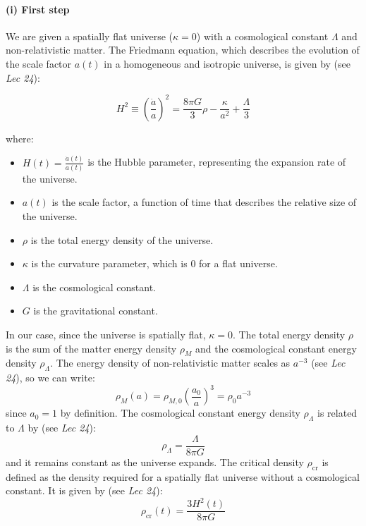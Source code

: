 \documentclass{article}
\begin{document}
\paragraph{(i) First step}
We are given a spatially flat universe ($\kappa = 0$) with a cosmological constant $\Lambda$ and non-relativistic matter. The Friedmann equation, which describes the evolution of the scale factor $a(t)$ in a homogeneous and isotropic universe, is given by (see \emph{Lec 24}):

\begin{equation}
\label{eq:friedmann}
H^{2} \equiv \left( \frac{\dot{a}}{a} \right)^{2} = \frac{8\pi G}{3}\rho - \frac{\kappa }{a^{2}} + \frac{\Lambda }{3}
\end{equation}

where:
\begin{itemize}
    \item $H(t) = \frac{\dot{a}(t)}{a(t)}$ is the Hubble parameter, representing the expansion rate of the universe.
    \item $a(t)$ is the scale factor, a function of time that describes the relative size of the universe.
    \item $\rho$ is the total energy density of the universe.
    \item $\kappa$ is the curvature parameter, which is 0 for a flat universe.
    \item $\Lambda$ is the cosmological constant.
    \item $G$ is the gravitational constant.
\end{itemize}

In our case, since the universe is spatially flat, $\kappa = 0$. The total energy density $\rho$ is the sum of the matter energy density $\rho_M$ and the cosmological constant energy density $\rho_\Lambda$. The energy density of non-relativistic matter scales as $a^{-3}$ (see \emph{Lec 24}), so we can write:
\begin{equation}
\rho_M(a) = \rho_{M,0} \left( \frac{a_0}{a} \right)^3 = \rho_{0} a^{-3}
\end{equation}
since $a_0 = 1$ by definition.
The cosmological constant energy density $\rho_\Lambda$ is related to $\Lambda$ by (see \emph{Lec 24}):
\begin{equation}
\rho_\Lambda = \frac{\Lambda}{8\pi G}
\end{equation}
and it remains constant as the universe expands.
The critical density $\rho_{\text{cr}}$ is defined as the density required for a spatially flat universe without a cosmological constant. It is given by (see \emph{Lec 24}):
\begin{equation}
\rho_{\text{cr}}(t) = \frac{3H^2(t)}{8\pi G}
\end{equation}
\end{document}
